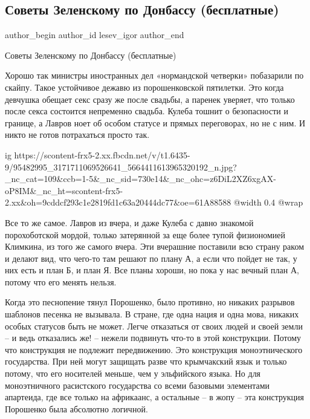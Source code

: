  
 
 
 
 
 
\subsection{Советы Зеленскому по Донбассу (бесплатные)}
\label{sec:01_05_2020.fb.lesev_igor.1.sovety_zelja_donbass}
 
\ifcmt
 author_begin
   author_id lesev_igor
 author_end
\fi

Советы Зеленскому по Донбассу (бесплатные)

Хорошо так министры иностранных дел «нормандской четверки» побазарили по
скайпу. Такое устойчивое дежавю из порошенковской пятилетки. Это когда девчушка
обещает секс сразу же после свадьбы, а паренек уверяет, что только после секса
состоится непременно свадьба. Кулеба тошнит о безопасности и границе, а Лавров
ноет об особом статусе и прямых переговорах, но не с ним. И никто не готов
потрахаться просто так.

\ifcmt
  ig https://scontent-frx5-2.xx.fbcdn.net/v/t1.6435-9/95482995_3171711069526641_5664411613965320192_n.jpg?_nc_cat=109&ccb=1-5&_nc_sid=730e14&_nc_ohc=z6DiL2XZ6xgAX-oP8IM&_nc_ht=scontent-frx5-2.xx&oh=9cddcf293c1e2819fd1c63a20444dc77&oe=61A88588
  @width 0.4
  @wrap 
\fi

Все то же самое. Лавров из вчера, и даже Кулеба с давно знакомой порохоботской
мордой, только затерянной за еще более тупой физиономией Климкина, из того же
самого вчера. Эти вчерашние поставили всю страну раком и делают вид, что
чего-то там решают по плану А, а если что пойдет не так, у них есть и план Б, и
план Я. Все планы хороши, но пока у нас вечный план А, потому что его менять
нельзя.

Когда это песнопение тянул Порошенко, было противно, но никаких разрывов
шаблонов песенка не вызывала. В стране, где одна нация и одна мова, никаких
особых статусов быть не может. Легче отказаться от своих людей и своей земли –
и ведь отказались же! – нежели подвинуть что-то в этой конструкции. Потому что
конструкция не подлежит передвижению. Это конструкция моноэтнического
государства. При ней могут защищать разве что крымчакский язык и только потому,
что его носителей меньше, чем у эльфийского языка. Но для моноэтничного
расистского государства со всеми базовыми элементами апартеида, где все только
на африкаанс, а остальные – в жопу – эта конструкция Порошенко была абсолютно
логичной.

